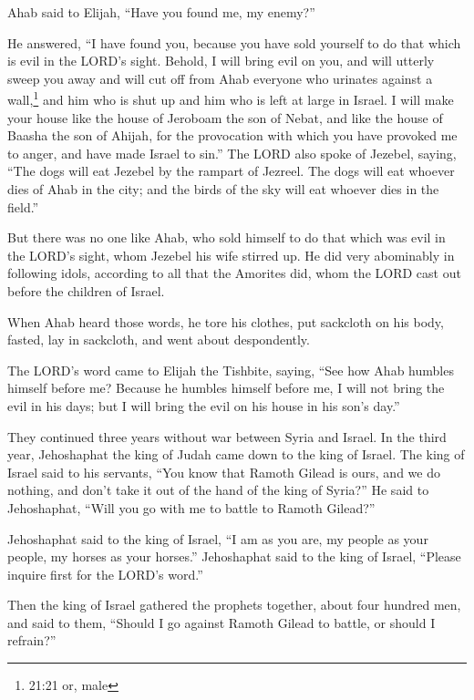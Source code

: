 \myverse{}Ahab said to Elijah, “Have you found me, my enemy?”

He answered, “I have found you, because you have sold yourself to do that which is evil in
the LORD’s sight.
\myverse{}Behold, I will bring evil on you, and will utterly sweep you away and will
cut off from Ahab everyone who urinates against a wall,\footnote{21:21 or, male
} and him who is shut up and him who is left at large in Israel.
\myverse{}I will make your house like the house of Jeroboam the son of Nebat, and like
the house of Baasha the son of Ahijah, for the provocation with which you have provoked me to anger, and
have made Israel to sin.”
\myverse{}The LORD also spoke of Jezebel, saying, “The dogs will eat Jezebel by the
rampart of Jezreel.
\myverse{}The dogs will eat whoever dies of Ahab in the city; and the birds of the
sky will eat whoever dies in the field.”

\myverse{}But there was no one like Ahab, who sold himself to do that
which was evil in the LORD’s sight, whom Jezebel his wife stirred up.
\myverse{}He did very abominably in following idols, according to all that the Amorites
did, whom the LORD cast out before the children of Israel.

\myverse{}When Ahab heard those words, he tore his clothes, put sackcloth
on his body, fasted, lay in sackcloth, and went about despondently.

\myverse{}The LORD’s word came to Elijah the Tishbite, saying,
\myverse{}“See how Ahab humbles himself before me? Because he humbles himself before
me, I will not bring the evil in his days; but I will bring the evil on his house in his son’s day.”



 \myverse*{}They continued three years without war between Syria and Israel.
\myverse{}In the third year, Jehoshaphat the king of Judah came down to the king of Israel.
\myverse{}The king of Israel said to his servants, “You know that Ramoth Gilead is ours,
and we do nothing, and don’t take it out of the hand of the king of Syria?”
\myverse{}He said to Jehoshaphat, “Will you go with me to battle to Ramoth Gilead?”

Jehoshaphat said to the king of Israel, “I am as you are, my people as your people, my horses
as your horses.”
\myverse{}Jehoshaphat said to the king of Israel, “Please inquire first for the LORD’s
word.”

\myverse{}Then the king of Israel gathered the prophets together, about
four hundred men, and said to them, “Should I go against Ramoth Gilead to battle, or should I refrain?”

